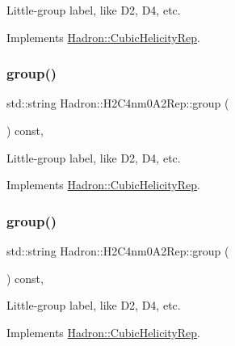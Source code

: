 Little-\/group label, like D2, D4, etc. 

Implements \mbox{\hyperlink{structHadron_1_1CubicHelicityRep_a101a7d76cd8ccdad0f272db44b766113}{Hadron\+::\+Cubic\+Helicity\+Rep}}.

\mbox{\label{structHadron_1_1H2C4nm0A2Rep_a91188ca54be99a0d11ac82323d7637ce}} 
\subsubsection{\texorpdfstring{group()}{group()}\hspace{0.1cm}{\footnotesize\ttfamily [3/5]}}
{\footnotesize\ttfamily std\+::string Hadron\+::\+H2\+C4nm0\+A2\+Rep\+::group (\begin{DoxyParamCaption}{ }\end{DoxyParamCaption}) const\hspace{0.3cm}{\ttfamily [inline]}, {\ttfamily [virtual]}}

Little-\/group label, like D2, D4, etc. 

Implements \mbox{\hyperlink{structHadron_1_1CubicHelicityRep_a101a7d76cd8ccdad0f272db44b766113}{Hadron\+::\+Cubic\+Helicity\+Rep}}.

\mbox{\label{structHadron_1_1H2C4nm0A2Rep_a91188ca54be99a0d11ac82323d7637ce}} 
\subsubsection{\texorpdfstring{group()}{group()}\hspace{0.1cm}{\footnotesize\ttfamily [4/5]}}
{\footnotesize\ttfamily std\+::string Hadron\+::\+H2\+C4nm0\+A2\+Rep\+::group (\begin{DoxyParamCaption}{ }\end{DoxyParamCaption}) const\hspace{0.3cm}{\ttfamily [inline]}, {\ttfamily [virtual]}}

Little-\/group label, like D2, D4, etc. 

Implements \mbox{\hyperlink{structHadron_1_1CubicHelicityRep_a101a7d76cd8ccdad0f272db44b766113}{Hadron\+::\+Cubic\+Helicity\+Rep}}.

